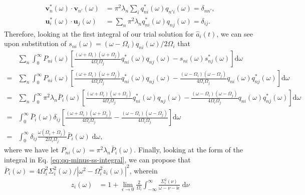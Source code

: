 \begin{equation}
\begin{split}
\mathbf{v}_n^*(\omega)\cdot\mathbf{v}_{n'}(\omega) &= \pi^2\lambda_n\sum_iq_{ni}^*(\omega)q_{n'i}(\omega) = \delta_{nn'},\\
\mathbf{u}_i^*(\omega)\cdot\mathbf{u}_j(\omega) &= \sum_n\pi^2\lambda_nq_{ni}^*(\omega)q_{nj}(\omega) = \delta_{ij}.
\end{split}
\end{equation}
Therefore, looking at the first integral of our trial solution for $\hat{a}_i(t)$, we can see upon substitution of $s_{ni}(\omega) = (\omega - \Omega_i)q_{ni}(\omega)/2\Omega_i$ that
\begin{equation}
\begin{split}
&\sum_n\int_0^\infty P_{ni}(\omega)\left[\frac{(\omega + \Omega_i)(\omega + \Omega_j)}{4\Omega_i\Omega_j}q_{ni}^*(\omega)q_{nj}(\omega) - s_{ni}(\omega)s_{nj}^*(\omega)\right]\mathrm{d}\omega\\
= &\sum_n\int_0^\infty P_{ni}(\omega)\left[\frac{(\omega + \Omega_i)(\omega + \Omega_j)}{4\Omega_i\Omega_j}q_{ni}^*(\omega)q_{nj}(\omega) - \frac{(\omega - \Omega_i)(\omega - \Omega_j)}{4\Omega_i\Omega_j}q_{ni}(\omega)q_{nj}^*(\omega)\right]\mathrm{d}\omega\\
= &\sum_n\int_0^\infty\pi^2\lambda_n\bar{P}_{i}(\omega)\left[\frac{(\omega + \Omega_i)(\omega + \Omega_j)}{4\Omega_i\Omega_j}q_{ni}^*(\omega)q_{nj}(\omega) - \frac{(\omega - \Omega_i)(\omega - \Omega_j)}{4\Omega_i\Omega_j}q_{ni}(\omega)q_{nj}^*(\omega)\right]\mathrm{d}\omega\\
= &\int_0^\infty\bar{P}_{i}(\omega)\delta_{ij}\left[\frac{(\omega + \Omega_i)(\omega + \Omega_j)}{4\Omega_i\Omega_j} - \frac{(\omega - \Omega_i)(\omega - \Omega_j)}{4\Omega_i\Omega_j}\right]\mathrm{d}\omega\\
= &\int_0^\infty\delta_{ij}\frac{\omega(\Omega_i + \Omega_j)}{2\Omega_i\Omega_j}\bar{P}_i(\omega)\;\mathrm{d}\omega,
\end{split}
\end{equation}
where we have let $P_{ni}(\omega) = \pi^2\lambda_n\bar{P}_i(\omega)$. Finally, looking at the form of the integral in Eq. \eqref{eq:qq-minus-ss-integral}, we can propose that $\bar{P}_{i}(\omega) = 4\Omega_i^2 \Sigma_i^2(\omega)/|\omega^2 - \Omega_i^2z_i(\omega)|^2$, wherein
\begin{equation}
\begin{split}
z_i(\omega) &= 1 + \lim_{\epsilon\to0}\frac{2}{\Omega_i}\int_{-\infty}^{\infty}\frac{\Sigma_i^2(\nu)}{\omega - \nu - \mathrm{i}\epsilon}\;\mathrm{d}\nu
\end{split}
\end{equation}
